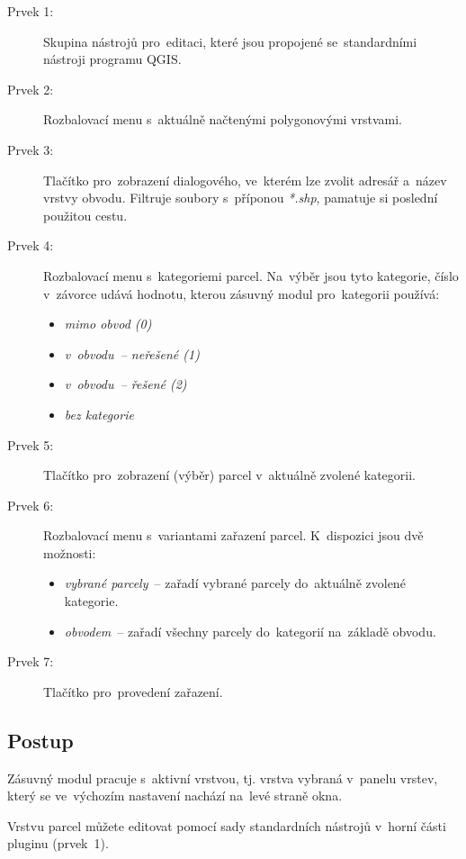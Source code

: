 \begin{description}
	\item[Prvek 1:] Skupina nástrojů pro~editaci, které jsou propojené se~standardními nástro\-ji programu QGIS.
	\item[Prvek 2:] Rozbalovací menu s~aktuálně načtenými polygonovými vrstvami.
	\item[Prvek 3:] Tlačítko pro~zobrazení dialogového, ve~kterém lze zvolit adresář a~název vrstvy obvodu. Filtruje soubory s~příponou \textit{*.shp}, pamatuje si poslední použitou cestu.
	\item[Prvek 4:] Rozbalovací menu s~kategoriemi parcel. Na~výběr jsou tyto kategorie, číslo v~závorce udává hodnotu, kterou zásuvný modul pro~kategorii používá:
	\begin{itemize}[leftmargin=1.5cm, noitemsep]
		\item \textit{mimo obvod (0)}
		\item \textit{v~obvodu~– neřešené (1)}
		\item \textit{v~obvodu~– řešené (2)}
		\item \textit{bez kategorie}
	\end{itemize}
	\item[Prvek 5:] Tlačítko pro~zobrazení (výběr) parcel v~aktuálně zvolené kategorii.
	\item[Prvek 6:] Rozbalovací menu s~variantami zařazení parcel. K~dispozici jsou dvě možnosti:
	\begin{itemize}[leftmargin=1.5cm, noitemsep]
		\item \textit{vybrané parcely}~– zařadí vybrané parcely do~aktuálně zvolené kategorie.
		\item \textit{obvodem}~– zařadí všechny parcely do~kategorií na~základě obvodu.
	\end{itemize}
	\item[Prvek 7:] Tlačítko pro~provedení zařazení.
\end{description}

\subsection{Postup}
\label{manual_editace_postup}

Zásuvný modul pracuje s~aktivní vrstvou, tj. vrstva vybraná v~panelu vrstev, který se ve~výchozím nastavení nachází na~levé straně okna.

Vrstvu parcel můžete editovat pomocí sady standardních nástrojů v~horní části pluginu (prvek~1).

